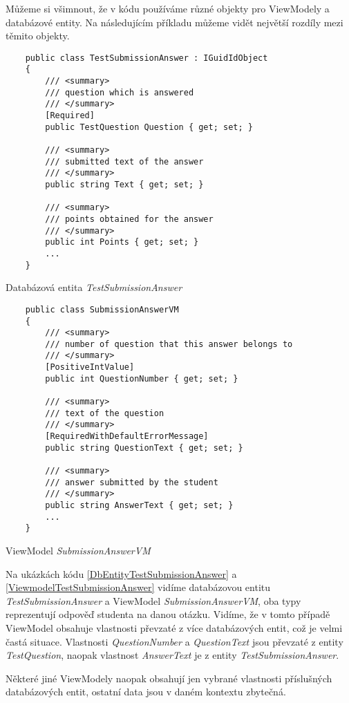 Můžeme si všimnout, že v kódu používáme různé objekty pro ViewModely a databázové entity. 
Na následujícím příkladu můžeme vidět největší rozdíly mezi těmito objekty.

\lstset{style=sharpc}

\begin{program}
	\begin{lstlisting}
	public class TestSubmissionAnswer : IGuidIdObject
	{	
		/// <summary>
		/// question which is answered
		/// </summary>
		[Required]
		public TestQuestion Question { get; set; }
		
		/// <summary>
		/// submitted text of the answer
		/// </summary>
		public string Text { get; set; }
		
		/// <summary>
		/// points obtained for the answer
		/// </summary>
		public int Points { get; set; }
		...
	}
	\end{lstlisting}
	\caption{Databázová entita \textit{TestSubmissionAnswer}}
	\label{DbEntityTestSubmissionAnswer}
\end{program}

\begin{program}
	\begin{lstlisting}
	public class SubmissionAnswerVM
	{	
		/// <summary>
		/// number of question that this answer belongs to
		/// </summary>
		[PositiveIntValue]
		public int QuestionNumber { get; set; }
		
		/// <summary>
		/// text of the question
		/// </summary>
		[RequiredWithDefaultErrorMessage]
		public string QuestionText { get; set; }
		
		/// <summary>
		/// answer submitted by the student
		/// </summary>
		public string AnswerText { get; set; }
		...
	}
	\end{lstlisting}
	\caption{ViewModel \textit{SubmissionAnswerVM}}
	\label{ViewmodelTestSubmissionAnswer}
\end{program}

Na ukázkách kódu \ref{DbEntityTestSubmissionAnswer} a \ref{ViewmodelTestSubmissionAnswer} vidíme databázovou entitu \textit{TestSubmissionAnswer} a ViewModel \textit{SubmissionAnswerVM}, oba typy reprezentují odpověď studenta na danou otázku.
Vidíme, že v tomto případě ViewModel obsahuje vlastnosti převzaté z více databázových entit, což je velmi častá situace. Vlastnosti \textit{QuestionNumber} a \textit{QuestionText} jsou převzaté z entity \textit{TestQuestion}, naopak vlastnost \textit{AnswerText} je z entity \textit{TestSubmissionAnswer}.

Některé jiné ViewModely naopak obsahují jen vybrané vlastnosti příslušných databázových entit, ostatní data jsou v daném kontextu zbytečná.

